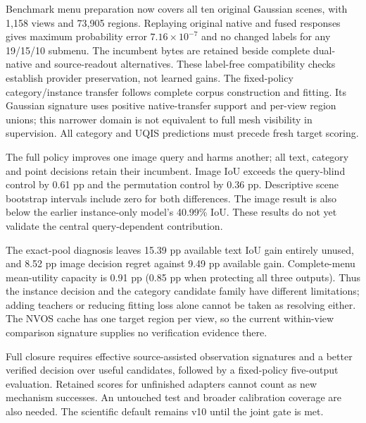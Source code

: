 \documentclass[10pt]{article}
\begin{document}
Benchmark menu preparation now covers all ten original Gaussian scenes, with
1,158 views and 73,905 regions. Replaying original native and fused responses
gives maximum probability error $7.16\times10^{-7}$ and no changed labels for
any 19/15/10 submenu. The incumbent bytes are retained beside complete
dual-native and source-readout alternatives. These label-free compatibility
checks establish provider preservation, not learned gains. The fixed-policy
category/instance transfer follows complete corpus construction and fitting. Its
Gaussian signature uses positive native-transfer support and per-view region
unions; this narrower domain is not equivalent to full mesh visibility in
supervision. All category and UQIS predictions must precede fresh target scoring.

\begin{table}[ht]
\centering\small
\resizebox{\linewidth}{!}{}
\caption{One checkpoint and one full-policy margin on ten ScanNet rooms and
all 268 UQIS queries (\%). S19/15/10 denote menu mIoU. All 19 scene-job predictions
are sealed before scoring; point responses are exact. No per-task winners are
combined.}
\end{table}
The full policy improves one image query and harms another; all text, category
and point decisions retain their incumbent. Image IoU exceeds the query-blind
control by 0.61 pp and the permutation control by 0.36 pp. Descriptive scene
bootstrap intervals include zero for both differences. The image result is also
below the earlier instance-only model's 40.99\% IoU. These results do not yet
validate the central query-dependent contribution.

The exact-pool diagnosis leaves 15.39 pp available text IoU gain entirely unused,
and 8.52 pp image decision regret against 9.49 pp available gain. Complete-menu
mean-utility capacity is 0.91 pp (0.85 pp when protecting all three outputs).
Thus the instance decision and the category candidate family have different
limitations; adding teachers or reducing fitting loss alone cannot be taken as
resolving either. The NVOS cache has one target region per view, so the current
within-view comparison signature supplies no verification evidence there.

Full closure requires effective source-assisted observation signatures and a
better verified decision over useful candidates, followed by a fixed-policy five-output
evaluation. Retained scores for unfinished adapters cannot count as new mechanism
successes. An untouched test and broader calibration coverage are also needed.
The scientific default remains v10 until the joint gate is met.
\end{document}
